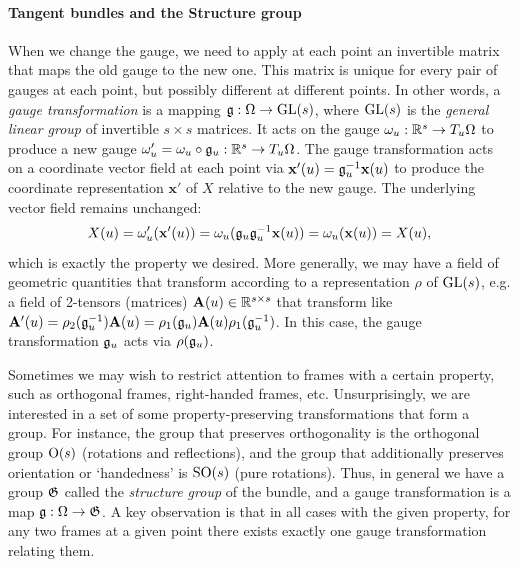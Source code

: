 \paragraph{Tangent bundles and the Structure group}
When we change the gauge, we need to apply at each point an   invertible matrix that maps the old gauge to the new one.  This matrix is unique for every pair of gauges at each point, but possibly different at different points.  
%
In other words, a {\em gauge transformation} is a mapping ${\mathfrak{g}} : \Omega \rightarrow \operatorname{GL}(s)$, where $\operatorname{GL}(s)$ is the {\em general linear group} of invertible $s \times s$ matrices.
It acts on the gauge $\omega_u : \mathbb{R}^s \rightarrow T_u \Omega$ to produce a new gauge $\omega'_u = \omega_u \circ {\mathfrak{g}}_u : \mathbb{R}^s \rightarrow T_u \Omega$. 
%
The gauge transformation acts on a coordinate vector field %
at each point 
via $\mathbf{x}'(u) = {\mathfrak{g}}^{-1}_u \mathbf{x}(u)$ to produce the coordinate representation $\mathbf{x}'$ of $X$ relative to the new gauge.
%
The underlying vector field remains unchanged: 
$$
X(u) = \omega'_u(\mathbf{x'}(u)) = \omega_u( {\mathfrak{g}}_u {\mathfrak{g}}^{-1}_u \mathbf{x}(u)) = \omega_u(\mathbf{x}(u)) = X(u), 
$$
which is exactly the property we desired. 
%
%
%
More generally, we may have a field of geometric quantities that transform according to a representation $\rho$ of $\operatorname{GL}(s)$, e.g. a field of 2-tensors (matrices) $\mathbf{A}(u) \in \mathbb{R}^{s \times s}$ that transform like $\mathbf{A'}(u) = \rho_2({\mathfrak{g}}^{-1}_u) \mathbf{A}(u) = \rho_1({\mathfrak{g}}_u) \mathbf{A}(u) \rho_1({\mathfrak{g}}^{-1}_u)$. %
In this case, the gauge transformation ${\mathfrak{g}}_u$ acts via $\rho({\mathfrak{g}}_u)$.

Sometimes we may wish to restrict attention to frames with a certain property, such as orthogonal frames, right-handed frames, etc.
Unsurprisingly, we are interested in a set of  some property-preserving transformations that  form a group.
For instance, the group that preserves orthogonality is the orthogonal group $\operatorname{O}(s)$ (rotations and reflections), and the group that additionally preserves  orientation or `handedness' is $\operatorname{SO}(s)$ (pure rotations).
Thus, in general we have a group ${\mathfrak{G}}$ called the \emph{structure group} of the bundle, and a gauge transformation is a map ${\mathfrak{g}} : \Omega \rightarrow {\mathfrak{G}}$.
A key observation is that in all cases with the given property, for any two frames at a given point there exists exactly one gauge transformation relating them.

